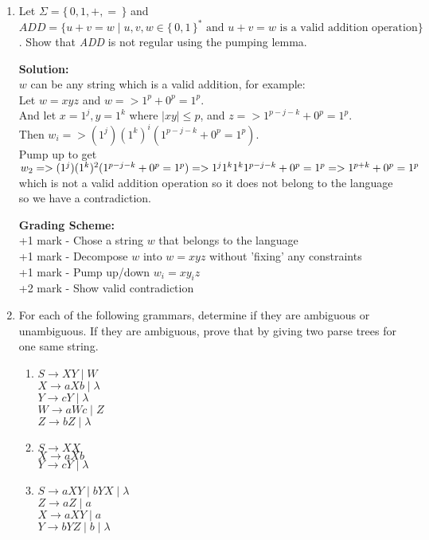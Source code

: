 \documentclass[11pt, article, oneside]{memoir}
\newcommand{\set}[1]{\{\, #1\, \}}
\begin{document}
\begin{enumerate}
    \item 
        Let \(\Sigma = \set{0, 1, +, =}\) and \(ADD = \{ u+v=w \mid u, v, w \in \set{0, 1}^* \text{ and } u+v=w \text{ is a valid addition operation}\}\). Show that \textit{ADD} is not regular using the pumping lemma.
        
        \textbf{Solution:}
        \\\(w\) can be any string which is a valid addition, for example:
        \\Let \(w = xyz\) and \(w => {1^p+0^p=1^p}\).
        \\And let \(x = 1^j, y = 1^k\) where \(|xy| \leq p\), and \(z => {1^{p - j - k}+0^p=1^p}\).
        \\Then \(w_i => {(1^j)(1^k)^i(1^{p - j - k}+0^p=1^p)}\).
        \\Pump up to get \(w_2 => {(1^j)(1^k)^2(1^{p - j - k}+0^p=1^p)}
        \\=> {1^j1^k1^k1^{p - j - k}+0^p=1^p}
        \\=> {1^{p+k}+0^p=1^p}\)
        \\which is not a valid addition operation so it does not belong to the language so we have a contradiction.

        \textbf{Grading Scheme:}
        \\+1 mark - Chose a string \(w\) that belongs to the language
        \\+1 mark - Decompose \(w\) into \(w = xyz\) without 'fixing' any constraints
        \\+1 mark - Pump up/down \(w_i = xy_iz\)
        \\+2 mark - Show valid contradiction
        
    \item
        For each of the following grammars, determine if they are ambiguous or unambiguous. If they are ambiguous, prove that by giving two parse trees for one same string.
        \begin{enumerate}
            \item
                \(S \rightarrow XY \mid W \)
                \\\(X \rightarrow aXb \mid \lambda\)
                \\\(Y \rightarrow cY \mid \lambda\)
                \\\(W \rightarrow aWc \mid Z\)
                \\\(Z \rightarrow bZ \mid \lambda\)
            \item
                \(S \rightarrow XX \)
                \\\(X \rightarrow aXb\)
                \\\(Y \rightarrow cY \mid \lambda\)
            \item
                \(S \rightarrow aXY \mid bYX \mid \lambda \)
                \\\(Z \rightarrow aZ \mid a\)
                \\\(X \rightarrow aXY \mid a \)
                \\\(Y \rightarrow bYZ \mid b \mid \lambda\) 
        \end{enumerate}


\end{enumerate}
\end{document}
